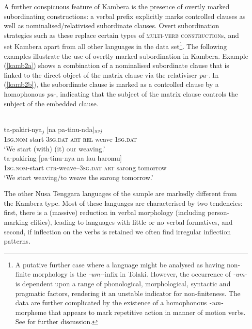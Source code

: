 A further conspicuous feature of Kambera is the presence of overtly marked subordinating constructions: a verbal prefix explicitly marks controlled clauses as well as nominalised/relativised subordinate clauses. Overt subordination strategies such as these replace certain types of \textsc{multi-verb construction}s, and set Kambera apart from all other languages in the data set\footnote{A putative further case where a language might be analysed as having non-finite morphology is the \textit{-um-}-infix in Tolaki. However, the occurrence of \textit{-um-} is dependent upon a range of phonological, morphological, syntactic and pragmatic factors, rendering it an unstable indicator for non-finiteness. The data are further complicated by the existence of a homophonous \textit{-um-} morpheme that appears to mark repetitive action in manner of motion verbs. See \citep[117]{mead2008verb} for further discussion.}. The following examples illustrate the use of overtly marked subordination in Kambera. Example (\ref{kamb2a}) shows a combination of a nominalised subordinate clause that is linked to the direct object of the matrix clause via the relativiser \textit{pa-}. In (\ref{kamb2b}), the subordinate clause is marked as a controlled clause by a homophonous \textit{pa-}, indicating that the subject of the matrix clause controls the subject of the embedded clause.

\ea 
{}\\
\ea \label{kamb2a}
\gll ta-pakiri-nya$_j$ $[$na pa-tinu-nda$]_{\textsc{np} \textit{j}}$ \\
\textsc{1}\textsc{sg}.\textsc{nom}-start-\textsc{3}\textsc{sg}.\textsc{dat} \textsc{art} \textsc{rel}-weave-\textsc{1}\textsc{sg}.\textsc{dat} \\
\glft `We start (with) (it) our weaving.' \\ 
\ex \label{kamb2b}
\gll ta-pakiring $[$pa-tinu-nya na lau haromu$]$ \\ 
\textsc{1}\textsc{sg}.\textsc{nom}-start \textsc{ctr}-weave--\textsc{3}\textsc{sg}.\textsc{dat} \textsc{art} sarong tomorrow \\
\glft `We start weaving/to weave the sarong tomorrow.'\\ 
\z
\z

The other Nusa Tenggara languages of the sample are markedly different from the Kambera type. Most of these languages are characterised by two tendencies: first, there is a (massive) reduction in verbal morphology (including person-marking clitics), leading to languages with little or no verbal formatives, and second, if inflection on the verbs is retained we often find irregular inflection patterns. 

